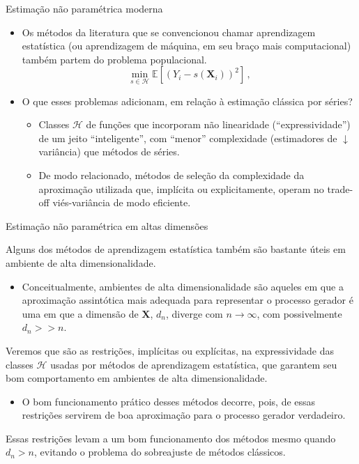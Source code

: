 \documentclass[11pt]{beamer}
\newenvironment{halfwideitemize}{\itemize\addtolength{\itemsep}{0.5em}}{\enditemize}
\begin{document}
	\begin{frame}{Estimação não paramétrica moderna}
		\begin{itemize}
			\item Os métodos da literatura que se convencionou chamar aprendizagem estatística (ou aprendizagem de máquina, em seu braço mais computacional) também partem do problema populacional.
						$$\operatorname{min}_{s \in \mathcal{H}}\mathbb{E}[(Y_i - s(\boldsymbol{X}_i))^2]\, ,$$
			\item O que esses problemas adicionam, em relação à  estimação clássica por séries?
			\begin{itemize}
				\item Classes $\mathcal{H}$ de funções que incorporam não linearidade (``expressividade'') de um jeito ``inteligente'', com ``menor'' complexidade (estimadores de $\downarrow$ variância) que métodos de séries.
				\item De modo relacionado, métodos de seleção da complexidade da aproximação utilizada que, implícita ou explicitamente, operam no trade-off viés-variância de modo eficiente.
			\end{itemize}
			
		\end{itemize}
	\end{frame}
	\begin{frame}{Estimação não paramétrica em altas dimensões}
		\begin{halfwideitemize}
			\item Alguns dos métodos de aprendizagem estatística também são bastante úteis em {\color{blue}ambiente de alta dimensionalidade}.
			\begin{itemize}
				\item Conceitualmente, ambientes de alta dimensionalidade  são aqueles em que a aproximação assintótica mais adequada para representar o processo gerador é uma em que a dimensão de $\boldsymbol{X}$, $d_n$, diverge com $n \to \infty$, com possivelmente $d_n >>n$.
			\end{itemize}
				\item Veremos que são as restrições, implícitas ou explícitas, na expressividade das classes $\mathcal{H}$ usadas por métodos de aprendizagem estatística, que garantem seu bom comportamento em ambientes de alta dimensionalidade.
			\begin{itemize}
				\item O bom funcionamento prático desses métodos decorre, pois, de essas restrições servirem de boa aproximação para o processo gerador verdadeiro.
			\end{itemize}
			\item Essas restrições levam a um bom funcionamento dos métodos mesmo quando $d_n > n$, evitando o problema do {\color{blue}sobreajuste} de métodos clássicos.
		\end{halfwideitemize}
\end{frame}
\end{document}

